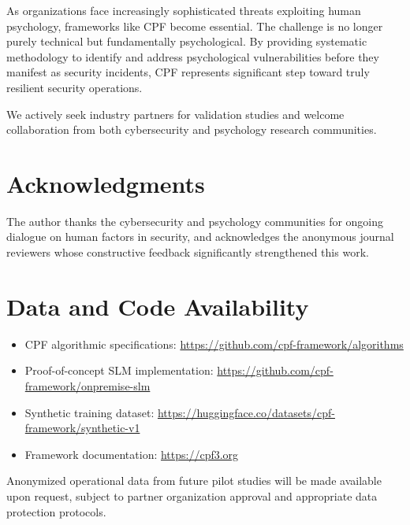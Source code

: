\documentclass[11pt, a4paper]{article}
\begin{document}
As organizations face increasingly sophisticated threats exploiting human psychology, frameworks like CPF become essential. The challenge is no longer purely technical but fundamentally psychological. By providing systematic methodology to identify and address psychological vulnerabilities before they manifest as security incidents, CPF represents significant step toward truly resilient security operations.

We actively seek industry partners for validation studies and welcome collaboration from both cybersecurity and psychology research communities.

\section*{Acknowledgments}

The author thanks the cybersecurity and psychology communities for ongoing dialogue on human factors in security, and acknowledges the anonymous journal reviewers whose constructive feedback significantly strengthened this work.

\section*{Data and Code Availability}

\begin{itemize}
\item CPF algorithmic specifications: \url{https://github.com/cpf-framework/algorithms}
\item Proof-of-concept SLM implementation: \url{https://github.com/cpf-framework/onpremise-slm}\cite{canale2024slm}
\item Synthetic training dataset: \url{https://huggingface.co/datasets/cpf-framework/synthetic-v1}
\item Framework documentation: \url{https://cpf3.org}
\end{itemize}

Anonymized operational data from future pilot studies will be made available upon request, subject to partner organization approval and appropriate data protection protocols.
\end{document}
